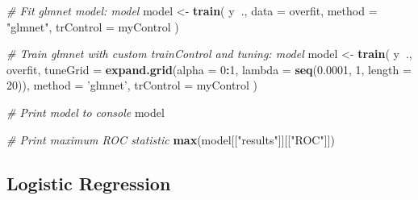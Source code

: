 \documentclass[]{book}
\newenvironment{Shaded}{\begin{snugshade}}{\end{snugshade}}
\newcommand{\KeywordTok}[1]{\textcolor[rgb]{0.13,0.29,0.53}{\textbf{#1}}}
\newcommand{\DataTypeTok}[1]{\textcolor[rgb]{0.13,0.29,0.53}{#1}}
\newcommand{\DecValTok}[1]{\textcolor[rgb]{0.00,0.00,0.81}{#1}}
\newcommand{\FloatTok}[1]{\textcolor[rgb]{0.00,0.00,0.81}{#1}}
\newcommand{\StringTok}[1]{\textcolor[rgb]{0.31,0.60,0.02}{#1}}
\newcommand{\CommentTok}[1]{\textcolor[rgb]{0.56,0.35,0.01}{\textit{#1}}}
\newcommand{\OperatorTok}[1]{\textcolor[rgb]{0.81,0.36,0.00}{\textbf{#1}}}
\newcommand{\NormalTok}[1]{#1}
\theoremstyle{definition}
\theoremstyle{definition}
\theoremstyle{definition}
\theoremstyle{remark}
\begin{document}
\begin{Shaded}
\begin{Highlighting}[]
\CommentTok{# Fit glmnet model: model}
\NormalTok{model <-}\StringTok{ }\KeywordTok{train}\NormalTok{(}
\NormalTok{  y}\OperatorTok{~}\NormalTok{., }\DataTypeTok{data =}\NormalTok{ overfit,}
  \DataTypeTok{method =} \StringTok{"glmnet"}\NormalTok{,}
  \DataTypeTok{trControl =}\NormalTok{ myControl}
\NormalTok{)}

\CommentTok{# Train glmnet with custom trainControl and tuning: model}
\NormalTok{model <-}\StringTok{ }\KeywordTok{train}\NormalTok{(}
\NormalTok{  y}\OperatorTok{~}\NormalTok{., overfit,}
  \DataTypeTok{tuneGrid =} \KeywordTok{expand.grid}\NormalTok{(}\DataTypeTok{alpha =} \DecValTok{0}\OperatorTok{:}\DecValTok{1}\NormalTok{, }\DataTypeTok{lambda =} \KeywordTok{seq}\NormalTok{(}\FloatTok{0.0001}\NormalTok{, }\DecValTok{1}\NormalTok{, }\DataTypeTok{length =} \DecValTok{20}\NormalTok{)),}
  \DataTypeTok{method =} \StringTok{'glmnet'}\NormalTok{,}
  \DataTypeTok{trControl =}\NormalTok{ myControl}
\NormalTok{)}

\CommentTok{# Print model to console}
\NormalTok{model}

\CommentTok{# Print maximum ROC statistic}
\KeywordTok{max}\NormalTok{(model[[}\StringTok{"results"}\NormalTok{]][[}\StringTok{"ROC"}\NormalTok{]])}
\end{Highlighting}
\end{Shaded}

\subsection{Logistic Regression}\label{logistic-regression-1}

\begin{Shaded}
\end{Shaded}
\end{document}
